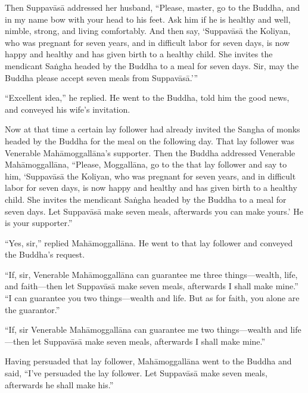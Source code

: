 \documentclass[12pt,openany]{book}%
\begin{document}
Then \textsanskrit{Suppavāsā} addressed her husband, “Please, master, go to the Buddha, and in my name bow with your head to his feet. Ask him if he is healthy and well, nimble, strong, and living comfortably. And then say, ‘\textsanskrit{Suppavāsā} the Koliyan, who was pregnant for seven years, and in difficult labor for seven days, is now happy and healthy and has given birth to a healthy child. She invites the mendicant \textsanskrit{Saṅgha} headed by the Buddha to a meal for seven days. Sir, may the Buddha please accept seven meals from \textsanskrit{Suppavāsā}.’” 

“Excellent idea,” he replied. He went to the Buddha, told him the good news, and conveyed his wife’s invitation. 

Now at that time a certain lay follower had already invited the Sangha of monks headed by the Buddha for the meal on the following day. That lay follower was Venerable \textsanskrit{Mahāmoggallāna}’s supporter. Then the Buddha addressed Venerable \textsanskrit{Mahāmoggallāna}, “Please, \textsanskrit{Moggallāna}, go to the that lay follower and say to him, ‘\textsanskrit{Suppavāsā} the Koliyan, who was pregnant for seven years, and in difficult labor for seven days, is now happy and healthy and has given birth to a healthy child. She invites the mendicant \textsanskrit{Saṅgha} headed by the Buddha to a meal for seven days. Let \textsanskrit{Suppavāsā} make seven meals, afterwards you can make yours.’ He is your supporter.” 

“Yes, sir,” replied \textsanskrit{Mahāmoggallāna}. He went to that lay follower and conveyed the Buddha’s request. 

“If, sir, Venerable \textsanskrit{Mahāmoggallāna} can guarantee me three things—wealth, life, and faith—then let \textsanskrit{Suppavāsā} make seven meals, afterwards I shall make mine.” “I can guarantee you two things—wealth and life. But as for faith, you alone are the guarantor.” 

“If, sir Venerable \textsanskrit{Mahāmoggallāna} can guarantee me two things—wealth and life—then let \textsanskrit{Suppavāsā} make seven meals, afterwards I shall make mine.” 

Having persuaded that lay follower, \textsanskrit{Mahāmoggallāna} went to the Buddha and said, “I’ve persuaded the lay follower. Let \textsanskrit{Suppavāsā} make seven meals, afterwards he shall make his.” 
\end{document}
